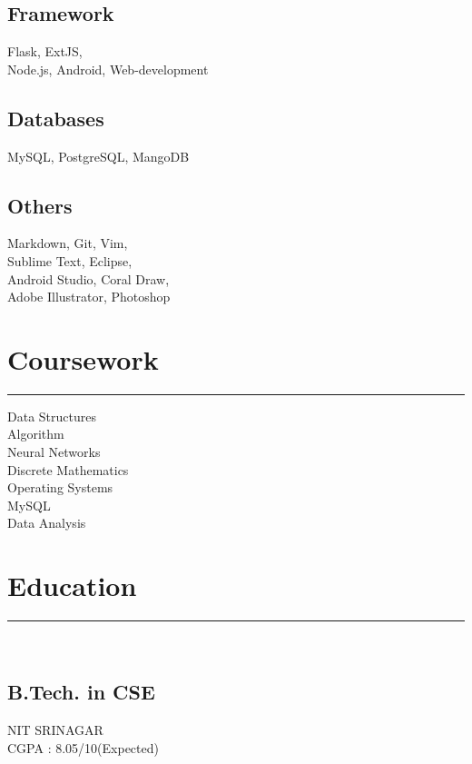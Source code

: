 \documentclass[localFont,alternative,10pt,compact]{main}
\begin{document}
\begin{minipage}[t]{0.33\textwidth}
        \subsection{Framework}
        Flask, ExtJS, \\Node.js, Android,
        Web-development
        \vspace{6pt}

        \subsection{Databases}
        MySQL, PostgreSQL, MangoDB
        \vspace{6pt}

        \subsection{Others}
        Markdown, Git, Vim, \\Sublime Text, Eclipse,\\
        Android Studio, Coral Draw,\\
        Adobe Illustrator, Photoshop
        \sectionsep


        \section{Coursework}
        \noindent\rule{5cm}{0.4pt}

        Data Structures\\
        Algorithm\\
        Neural Networks\\
        Discrete Mathematics\\
        Operating Systems\\
        MySQL\\
        Data Analysis
        \sectionsep


        \section{Education}
        \noindent\rule{5cm}{0.4pt}\\

        \subsection{B.Tech. in CSE}
        NIT SRINAGAR \\
        CGPA : 8.05/10(Expected)\\
        \vspace{8pt}


\end{minipage}
\end{document}
